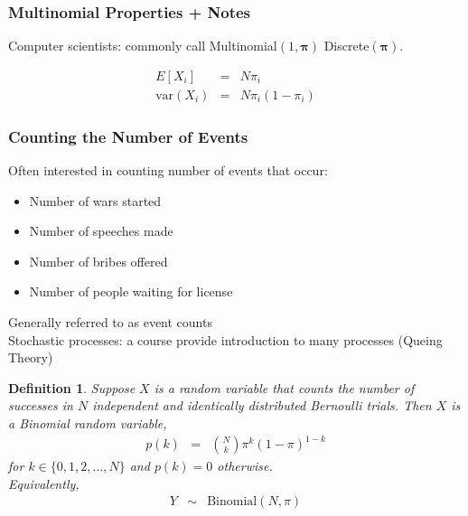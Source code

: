 \documentclass{beamer}
\newtheorem{defn}{Definition}
\numberwithin{equation}{section}
\begin{document}
\begin{frame}
\frametitle{Multinomial Properties + Notes}
Computer scientists: commonly call Multinomial$(1, \boldsymbol{\pi})$ \alert{Discrete}$(\boldsymbol{\pi})$. 

\begin{eqnarray}
E[X_{i} ] & = &  N \pi_{i} \nonumber \\
\text{var}(X_{i} ) & = &  N \pi_{i} (1- \pi_{i}) \nonumber 
\end{eqnarray}

\end{frame}

\begin{frame}
\frametitle{Counting the Number of Events}

Often interested in counting number of events that occur:
\begin{itemize}
\item[1)] Number of wars started
\item[2)] Number of speeches made
\item[3)] Number of bribes offered
\item[4)] Number of people waiting for license
\end{itemize}

Generally referred to as \alert{event counts}\\
\alert{Stochastic processes}: a course provide introduction to many processes (\alert{Queing Theory})


\end{frame}


\begin{frame}
\begin{defn}
Suppose $X$ is a random variable that counts the number of successes in $N$ independent and identically distributed Bernoulli trials.  Then $X$ is a \alert{Binomial} random variable, 
\begin{eqnarray}
p(k) & = & {{N}\choose{k}}\pi^{k} (1- \pi)^{1-k} \nonumber 
\end{eqnarray}
for $k \in \{0, 1, 2, \hdots, N\}$ and $p(k) = 0$ otherwise.  \\
Equivalently, 
\begin{eqnarray}
Y & \sim & \text{Binomial}(N, \pi) \nonumber 
\end{eqnarray}

\end{defn}

\end{frame}
\end{document}
